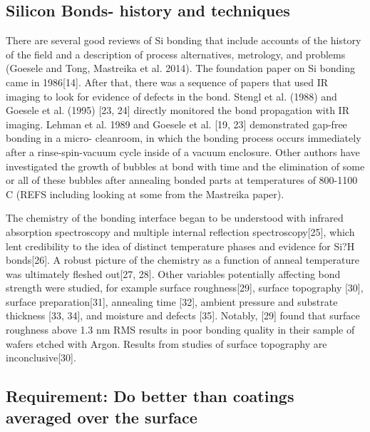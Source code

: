 \documentclass[osajnl,preprint,showpacs,superscriptaddress,12pt]{revtex4-1} %
\begin{document}
\subsection{Silicon Bonds- history and techniques}

There are several good reviews of Si bonding that include accounts of the history of the field and a description of process alternatives, metrology, and problems (Goesele and Tong, Mastreika et al.  2014).  The foundation paper on Si bonding came in 1986[14]. After that, there was a sequence of papers that used IR imaging to look for evidence of defects in the bond. Stengl et al. (1988) and Goesele et al. (1995) [23, 24] directly monitored the bond propagation with IR imaging. Lehman et al. 1989 and Goesele et al. [19, 23] demonstrated gap-free bonding in a micro- cleanroom, in which the bonding process occurs immediately after a rinse-spin-vacuum cycle inside of a vacuum enclosure.  Other authors have investigated the growth of bubbles at bond with time and the elimination of some or all of these bubbles after annealing bonded parts at temperatures of 800-1100 C (REFS including looking at some from the Mastreika paper).

The chemistry of the bonding interface began to be understood with infrared absorption spectroscopy and multiple internal reflection spectroscopy[25], which lent credibility to the idea of distinct temperature phases and evidence for Si?H bonds[26]. A robust picture of the chemistry as a function of anneal temperature was ultimately fleshed out[27, 28]. Other variables potentially affecting bond strength were studied, for example surface roughness[29], surface topography [30], surface preparation[31], annealing time [32], ambient pressure and substrate thickness [33, 34], and moisture and defects [35]. Notably, [29] found that surface roughness above 1.3 nm RMS results in poor bonding quality in their sample of wafers etched with Argon. Results from studies of surface topography are inconclusive[30]. 

\subsection{Requirement:  Do better than coatings averaged over the surface}
\end{document}

